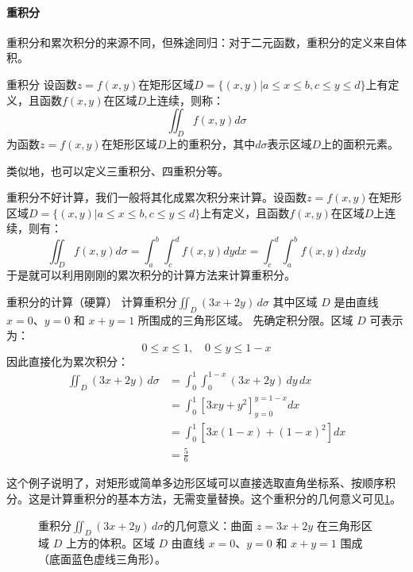 \paragraph{重积分} 重积分和累次积分的来源不同，但殊途同归：对于二元函数，重积分的定义来自体积。

\begin{definition}{重积分}{}
设函数$z = f(x, y)$在矩形区域$D = \{(x, y) | a \le x \le b, c \le y \le d\}$上有定义，且函数$f(x, y)$在区域$D$上连续，则称：
\begin{equation}
    \iint_D f(x, y) d\sigma
\end{equation}
为函数$z = f(x, y)$在矩形区域$D$上的重积分，其中$d\sigma$表示区域$D$上的面积元素。
\end{definition}

类似地，也可以定义三重积分、四重积分等。

重积分不好计算，我们一般将其化成累次积分来计算。设函数$z = f(x, y)$在矩形区域$D = \{(x, y) | a \le x \le b, c \le y \le d\}$上有定义，且函数$f(x, y)$在区域$D$上连续，则有：
\begin{equation}
    \iint_D f(x, y) d\sigma = \int_a^b \int_c^d f(x, y) dy dx = \int_c^d \int_a^b f(x, y) dx dy
\end{equation}
于是就可以利用刚刚的累次积分的计算方法来计算重积分。

\begin{example}{重积分的计算（硬算）}{}
    计算重积分$\iint_D (3x + 2y) \, d\sigma$
    其中区域 \( D \) 是由直线 \( x=0 \)、\( y=0 \) 和 \( x+y=1 \) 所围成的三角形区域。
    \tcblower
    先确定积分限。区域 \( D \) 可表示为：
    \[
        0 \le x \le 1, \quad 0 \le y \le 1-x
    \]
    因此直接化为累次积分：
    \begin{align}
        \iint_D (3x + 2y) \, d\sigma
        &= \int_{0}^{1} \int_{0}^{1-x} (3x + 2y) \, dy \, dx \\
        &= \int_{0}^{1} \left[ 3xy + y^2 \right]_{y=0}^{y=1-x} dx \\
        &= \int_{0}^{1} \left[ 3x(1-x) + (1-x)^2 \right] dx \\
        &= \frac{5}{6}
    \end{align}

    这个例子说明了，对矩形或简单多边形区域可以直接选取直角坐标系、按顺序积分。这是计算重积分的基本方法，无需变量替换。这个重积分的几何意义可见\cref{fig:double_integral_example1}。
\end{example}

\begin{figure}
    \centering
    
    \caption{重积分$\iint_D (3x + 2y) \, d\sigma$的几何意义：曲面 $z=3x+2y$ 在三角形区域 $D$ 上方的体积。区域 $D$ 由直线 $x=0$、$y=0$ 和 $x+y=1$ 围成（底面蓝色虚线三角形）。}
    \label{fig:double_integral_example1}
\end{figure}

